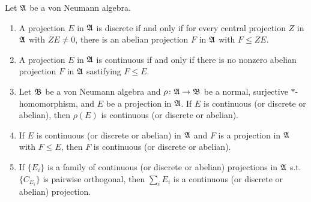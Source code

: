 \begin{prop}
	Let $\mathfrak{A}$ be a von Neumann algebra.
	\begin{enumerate}[label=\arabic*)]
		\item A projection $E$ in $\mathfrak{A}$ is discrete if and only if for every central projection $Z$ in $\mathfrak{A}$ with $ZE \neq 0$, there is an abelian projection $F$ in $\mathfrak{A}$ with $F \leqslant ZE$.
		\item A projection $E$ in $\mathfrak{A}$ is continuous if and only if there is no nonzero abelian projection $F$ in $\mathfrak{A}$ sastifying $F \leqslant E$.
		\item Let $\mathfrak{B}$ be a von Neumann algebra and $\rho \colon \mathfrak{A} \rightarrow \mathfrak{B}$ be a normal, surjective $*$-homomorphism, and $E$ be a projection in $\mathfrak{A}$. If $E$ is continuous (or discrete or abelian), then $\rho(E)$ is continuous (or discrete or abelian).
		\item If $E$ is continuous (or discrete or abelian) in $\mathfrak{A}$ and $F$ is a projection in $\mathfrak{A}$ with $F \leqslant E$, then $F$ is continuous (or discrete or abelian).
		\item If $\{E_i\}$ is a family of continuous (or discrete or abelian) projections in $\mathfrak{A}$ s.t. $\{C_{E_i}\}$ is pairwise orthogonal, then $\sum_i E_i$ is a continuous (or discrete or abelian) projection.
	\end{enumerate}
\end{prop}
